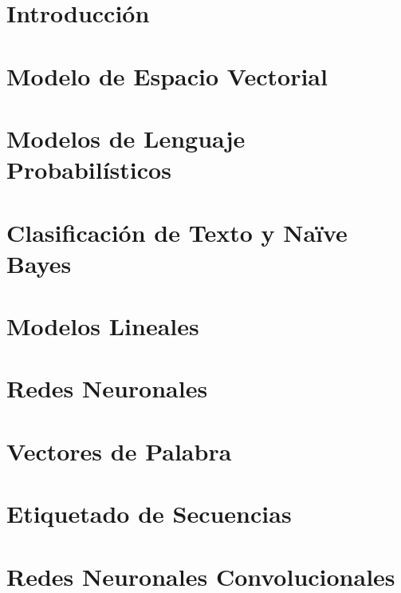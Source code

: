 \documentclass[11pt,fleqn]{book} %
\begin{document}
\chapter{Introducción}
\label{cap_intro}




\chapter{Modelo de Espacio Vectorial}
\label{cap_ir}



\chapter{Modelos de Lenguaje Probabilísticos}
\label{cap_plm}




\chapter{Clasificación de Texto y Naïve Bayes}
\label{cap_nb}



\chapter{Modelos Lineales}
\label{cap_lineales}



\chapter{Redes Neuronales}
\label{cap_redes}


\chapter{Vectores de Palabra}
\label{cap_embeddings}


\chapter{Etiquetado de Secuencias}
\label{cap_etisec}




\chapter{Redes Neuronales Convolucionales}
\label{cap_cnn}

\end{document}
